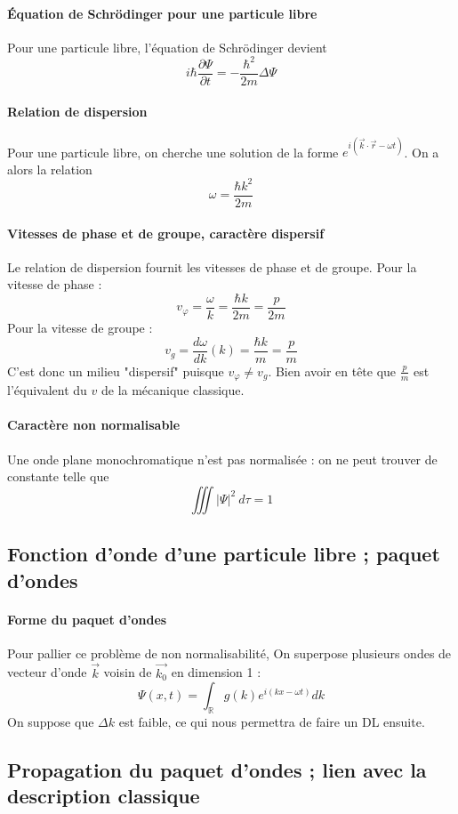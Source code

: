\documentclass[french]{book}
\theoremstyle{plain}
\theoremstyle{definition}
\theoremstyle{remark}
\newcommand{\R}{\mathbb{R}}
\begin{document}
\paragraph{Équation de Schrödinger pour une particule libre} Pour une particule libre, l'équation de Schrödinger devient $$i\hbar\frac{\partial\Psi}{\partial t}=-\frac{\hbar^2}{2m}\Delta\Psi$$
\paragraph{Relation de dispersion} Pour une particule libre, on cherche une solution de la forme $e^{i(\overrightarrow{k}\cdot\overrightarrow{r}-\omega t)}$. On a alors la relation $$\omega=\frac{\hbar k^2}{2m}$$
\paragraph{Vitesses de phase et de groupe, caractère dispersif} Le relation de dispersion fournit les vitesses de phase et de groupe. Pour la vitesse de phase : $$v_\varphi=\frac{\omega}{k}=\frac{\hbar k}{2m}=\frac{p}{2m}$$ Pour la vitesse de groupe : $$v_g=\frac{d\omega}{dk}(k)=\frac{\hbar k}{m}=\frac{p}{m}$$ C'est donc un milieu "dispersif" puisque $v_\varphi\ne v_g$. Bien avoir en tête que $\displaystyle\frac{p}{m}$ est l'équivalent du $v$ de la mécanique classique.
\paragraph{Caractère non normalisable}
Une onde plane monochromatique n’est pas normalisée : on ne peut trouver de constante telle que $$\iiint \lvert\Psi\rvert^2\ d\tau=1$$
\subsection{Fonction d'onde d'une particule libre ; paquet d'ondes}
\paragraph{Forme du paquet d'ondes} Pour pallier ce problème de non normalisabilité, On superpose plusieurs ondes de vecteur d'onde $\overrightarrow{k}$ voisin de $\overrightarrow{k_0}$ en dimension 1 : $$\Psi(x,t)=\int_\R g(k)e^{i(kx-\omega t)}dk$$ On suppose que $\Delta k$ est faible, ce qui nous permettra de faire un DL ensuite.
\subsection{Propagation du paquet d'ondes ; lien avec la description classique}
\end{document}
